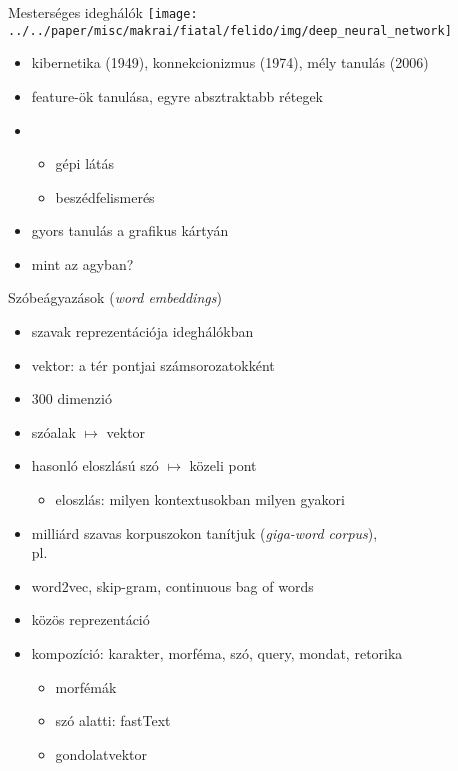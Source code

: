 \documentclass{beamer}
\newcommand{\bull}[1]{\begin{itemize}\item #1 \end{itemize}}
\begin{document}
\begin{frame}{Mesterséges ideghálók}
  \centering \texttt{[image: ../../paper/misc/makrai/fiatal/felido/img/deep\_neural\_network]}
  \begin{itemize}
    \item kibernetika (1949), konnekcionizmus (1974), mély tanulás (2006)
    \item feature-ök tanulása, egyre absztraktabb rétegek
    \item 
      \begin{itemize} 
        \item gépi látás \citep{Krizhevsky:2012} 
        \item beszédfelismerés \citep{Hinton:2012}
      \end{itemize}
    \item gyors tanulás a grafikus kártyán
    \item mint az agyban?
  \end{itemize}
\end{frame}
\begin{frame}{Szóbeágyazások (\emph{word embeddings})}
  \begin{itemize}
    \item szavak reprezentációja ideghálókban
    \item vektor: a tér pontjai számsorozatokként
    \item 300 dimenzió
    \item szóalak $\mapsto$ vektor
    \item hasonló eloszlású szó $\mapsto$ közeli pont
      \bull{eloszlás: milyen kontextusokban milyen gyakori}
    \item milliárd szavas korpuszokon tanítjuk (\emph{giga-word corpus}),  \\
      pl.~\cite{Halacsy:2004,Oravecz:2014}
    \item word2vec, skip-gram, continuous bag of words \citep{Mikolov:2013d}
    \item közös reprezentáció \citep{Collobert:2011,Hashimoto:2017}
    \item kompozíció: karakter, morféma, szó, query, mondat, retorika
      \begin{itemize}
        \item morfémák \citep{Lazaridou:2013}
        \item szó alatti: fastText \citep{Bojanowski:2016}
        \item gondolatvektor \citep{Vaswani:2017}
      \end{itemize}
  \end{itemize}
\end{frame}
\end{document}
